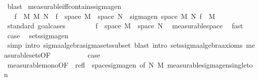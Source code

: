 \begin{isabellebody}
\ blast%
\endisatagproof
{\isafoldproof}%
%
\isadelimproof
\isanewline
%
\endisadelimproof
\isanewline
{}\isamarkupfalse%
\ measurable{\isacharunderscore}{\kern0pt}iff{\isacharunderscore}{\kern0pt}contains{\isacharunderscore}{\kern0pt}sigma{\isacharunderscore}{\kern0pt}gen{\isacharcolon}{\kern0pt}\isanewline
\ \ \ {\isachardoublequoteopen}{\isacharparenleft}{\kern0pt}f\ {\isasymin}\ M\ {\isasymrightarrow}\isactrlsub M\ N{\isacharparenright}{\kern0pt}\ {\isasymlongleftrightarrow}\ f\ {\isasymin}\ space\ M\ {\isasymrightarrow}\ space\ N\ {\isasymand}\ sigma{\isacharunderscore}{\kern0pt}gen\ {\isacharparenleft}{\kern0pt}space\ M{\isacharparenright}{\kern0pt}\ N\ {\isacharbraceleft}{\kern0pt}f{\isacharbraceright}{\kern0pt}\ {\isasymsubseteq}\ M{\isachardoublequoteclose}\isanewline
%
\isadelimproof
%
\endisadelimproof
%
\isatagproof
{}\isamarkupfalse%
\ {\isacharparenleft}{\kern0pt}standard{\isacharcomma}{\kern0pt}\ goal{\isacharunderscore}{\kern0pt}cases{\isacharparenright}{\kern0pt}\isanewline
\ \ \isamarkupfalse%
\ {}\isanewline
\ \ \isamarkupfalse%
\ {\isachardoublequoteopen}f\ {\isasymin}\ space\ M\ {\isasymrightarrow}\ space\ N{\isachardoublequoteclose}\ \isamarkupfalse%
\ measurable{\isacharunderscore}{\kern0pt}space\ \isamarkupfalse%
\ fast\isanewline
\ \ \isamarkupfalse%
\ {\isacharquery}{\kern0pt}case\ \isamarkupfalse%
\ sets{\isacharunderscore}{\kern0pt}sigma{\isacharunderscore}{\kern0pt}gen\ \isamarkupfalse%
\ {\isacharparenleft}{\kern0pt}simp{\isacharcomma}{\kern0pt}\ intro\ sigma{\isacharunderscore}{\kern0pt}algebra{\isachardot}{\kern0pt}sigma{\isacharunderscore}{\kern0pt}sets{\isacharunderscore}{\kern0pt}subset{\isacharcomma}{\kern0pt}\ {\isacharparenleft}{\kern0pt}blast\ intro{\isacharcolon}{\kern0pt}\ sets{\isachardot}{\kern0pt}sigma{\isacharunderscore}{\kern0pt}algebra{\isacharunderscore}{\kern0pt}axioms\ measurable{\isacharunderscore}{\kern0pt}sets{\isacharbrackleft}{\kern0pt}OF\ {}{\isacharbrackright}{\kern0pt}{\isacharparenright}{\kern0pt}{\isacharplus}{\kern0pt}{\isacharparenright}{\kern0pt}\ \isanewline
{}\isamarkupfalse%
\isanewline
\ \ \isamarkupfalse%
\ {}\isanewline
\ \ \isamarkupfalse%
\ {\isacharquery}{\kern0pt}case\ \isamarkupfalse%
\ measurable{\isacharunderscore}{\kern0pt}mono{\isacharbrackleft}{\kern0pt}OF\ {\isacharunderscore}{\kern0pt}\ refl\ {\isacharunderscore}{\kern0pt}\ space{\isacharunderscore}{\kern0pt}sigma{\isacharunderscore}{\kern0pt}gen{\isacharcomma}{\kern0pt}\ of\ N\ M{\isacharbrackright}{\kern0pt}\ measurable{\isacharunderscore}{\kern0pt}sigma{\isacharunderscore}{\kern0pt}gen{\isacharunderscore}{\kern0pt}singleton\ \isamarkupfalse%

\end{isabellebody}
